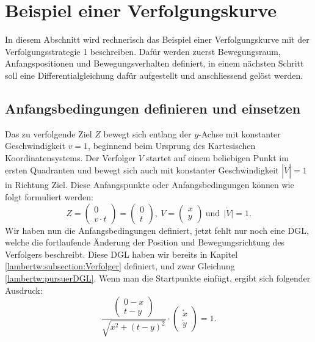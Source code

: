%
%
%
\section{Beispiel einer Verfolgungskurve
\label{lambertw:section:teil4}}
In diesem Abschnitt wird rechnerisch das Beispiel einer Verfolgungskurve mit der Verfolgungsstrategie 1 beschreiben. Dafür werden zuerst Bewegungsraum, Anfangspositionen und Bewegungsverhalten definiert, in einem nächsten Schritt soll eine Differentialgleichung dafür aufgestellt und anschliessend gelöst werden.

\subsection{Anfangsbedingungen definieren und einsetzen
	\label{lambertw:subsection:Anfangsbedingungen}}
Das zu verfolgende Ziel \(Z\) bewegt sich entlang der \(y\)-Achse mit konstanter Geschwindigkeit \(v = 1\), beginnend beim Ursprung des Kartesischen Koordinatensystems. Der Verfolger \(V\) startet auf einem beliebigen Punkt im ersten Quadranten und bewegt sich auch mit konstanter Geschwindigkeit \(|\dot{V}| = 1\) in Richtung Ziel. Diese Anfangspunkte oder Anfangsbedingungen können wie folgt formuliert werden:
\begin{equation}
	Z
	=
	\left( \begin{array}{c} 0 \\ v \cdot t \end{array} \right)
	=
	\left( \begin{array}{c} 0 \\ t \end{array} \right)
	,\:
	V
	=
	\left( \begin{array}{c} x \\ y \end{array} \right)
	\:\text{und}\:\:
	\bigl| \dot{V} \bigl|
	=
	1.
	\label{lambertw:Anfangsbed}
\end{equation}
Wir haben nun die Anfangsbedingungen definiert, jetzt fehlt nur noch eine DGL, welche die fortlaufende Änderung der Position und Bewegungsrichtung des Verfolgers beschreibt. 
Diese DGL haben wir bereits in Kapitel \ref{lambertw:subsection:Verfolger} definiert, und zwar Gleichung \eqref{lambertw:pursuerDGL}. Wenn man die Startpunkte einfügt, ergibt sich folgender Ausdruck:
\begin{equation}
	\frac{\left( \begin{array}{c} 0-x \\ t-y \end{array} \right)}{\sqrt{x^2 + (t-y)^2}}
	\cdot
	\left(\begin{array}{c} \dot{x} \\ \dot{y} \end{array}\right)
	=
	1.
	\label{lambertw:eqMitAnfangsbed}
\end{equation}

